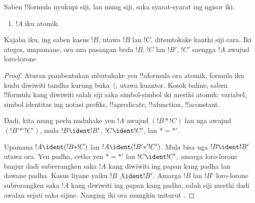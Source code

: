 \documentclass[../../../include/open-logic-section]{subfiles}
\begin{document}
\begin{prop}
Saben !!{formula} nyukupi siji, lan mung siji, saka syarat-syarat
ing ngisor iki.
\begin{enumerate}
\item $!A$ iku atomik.







\end{enumerate}
Kajaba iku, ing saben kasus $!B$, utawa $!B$ lan $!C$, ditemtokake
kanthi siji cara. Iki ateges, umpamane, ora ana pasangan beda $!B$,
$!C$ lan $!B'$, $!C'$ saengga $!A$ awujud loro-lorone
\end{prop}

\begin{proof}
Aturan pambentukan mbutuhake yen !!a{formula} ora atomik, formula iku
kudu diwiwiti tandha kurung buka~(, 
utawa kuantor. Kosok baline, saben !!{formula} kang diwiwiti salah
siji saka simbol-simbol iki mesthi atomik: variabel, simbol identitas
ing notasi prefiks, !!a{predicate}, !!a{function}, !!a{constant}.

Dadi, kita mung perlu nuduhake yen $!A$ awujud $(!B \ast
!C)$ lan uga awujud $(!B' \mathbin{\ast'} !C')$, mula $!B \ident
!B'$, $!C \ident !C'$, lan $\ast = {\ast'}$.

Upamana $!A \ident (!B \ast !C)$ lan $!A \ident (!B'
\mathbin{\ast'} !C')$. Mula bisa uga $!B \ident !B'$ utawa ora.
Yen padha, cetha yen $\ast = {\ast'}$ lan $!C \ident !C'$,
amarga loro-lorone banjur dadi subrerangken saka $!A$ kang diwiwiti
ing papan kang padha lan dawane padha. Kasus liyane yaiku
$!B \not\ident !B'$. Amarga $!B$ lan $!B'$ loro-lorone subrerangken
saka $!A$ kang diwiwiti ing papan kang padha, salah siji mesthi
dadi awalan sejati saka sijine. Nanging iki ora mungkin miturut
.
\end{proof}
\end{document}
